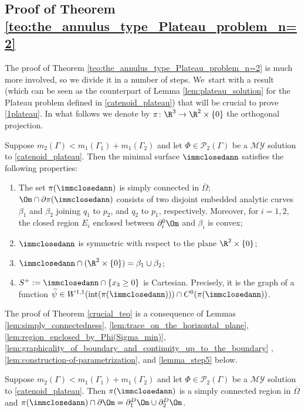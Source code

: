 \subsection{Proof of Theorem \ref{teo:the_annulus_type_Plateau_problem_n=2}}
The proof of
Theorem \ref{teo:the_annulus_type_Plateau_problem_n=2}
is much more involved, so we divide it in a number of steps. We~start with a result (which can be seen as the counterpart of
Lemma \ref{lem:plateau_solution} for the Plateau problem defined in \eqref{catenoid_plateau}) that will be crucial to prove \ref{1plateau}.
In what follows we denote by $\pi\colon\R^3\to\R^2\times\{0\}$ the orthogonal projection.
\begin{theorem}\label{crucial_teo}
Suppose $m_2(\Gamma)<m_1(\Gamma_1)+m_1(\Gamma_2)$ and let
$\Phi\in\mathcal{P}_2(\Gamma)$ be a $\mathcal{MY}$ solution to \eqref{catenoid_plateau}.
Then the minimal surface $\immclosedann$ satisfies the following properties:
\begin{enumerate}[label=$(\arabic*)$,wide]
\item \label{crucial1} The set $\pi(\immclosedann)$
is simply connected in $\overline\Omega$; $\Om\cap\partial \pi(\immclosedann)$
consists of two disjoint embedded analytic curves $\beta_1$ and $\beta_2$ joining $q_1$ to $p_2$, and $q_2$ to $p_1$, respectively.
Moreover, for
$i=1,2$,
the closed region $E_i$
enclosed between $\partial_i^0\Om$ and $\beta_i$
is convex;
\item\label{crucial2} $\immclosedann$ is symmetric with respect to the plane $\R^2\times\{0\}$;
\item\label{crucial3} $\immclosedann\cap(\R^2\times\{0\})=\beta_1\cup\beta_2$;
\item\label{crucial4} $S^+:=\immclosedann\cap \{x_3\ge0\}$ is Cartesian. Precisely, it is
the graph of a function $\widetilde\psi\in W^{1,1}(\mathrm{int}(\pi(\immclosedann)))\cap C^0({\pi(\immclosedann)})$.
\end{enumerate}
\end{theorem}
The proof of Theorem \ref{crucial_teo} is a consequence of Lemmas \ref{lem:simply_connectedness}, \ref{lem:trace_on_the_horizontal_plane}, \ref{lem:region_enclosed_by_Phi(Sigma_min)}, \ref{lem:graphicality_of_boundary_and_continuity_up_to_the_boundary} , \ref{lem:construction-of-parametrization}, and \ref{lemma_step5} below.
\begin{lemma}
\label{lem:simply_connectedness}
Suppose $m_2(\Gamma)<m_1(\Gamma_1)+m_1(\Gamma_2)$ and let
$\Phi\in\mathcal{P}_2(\Gamma)$ be a $\mathcal{MY}$ solution to \eqref{catenoid_plateau}.
Then $\pi(\immclosedann)$ is a simply connected region in $\overline\Omega$ and { $\pi(\immclosedann)\cap\partial\Om=\partial_1^D\Om\cup\partial_2^D\Om$}.
\end{lemma}
